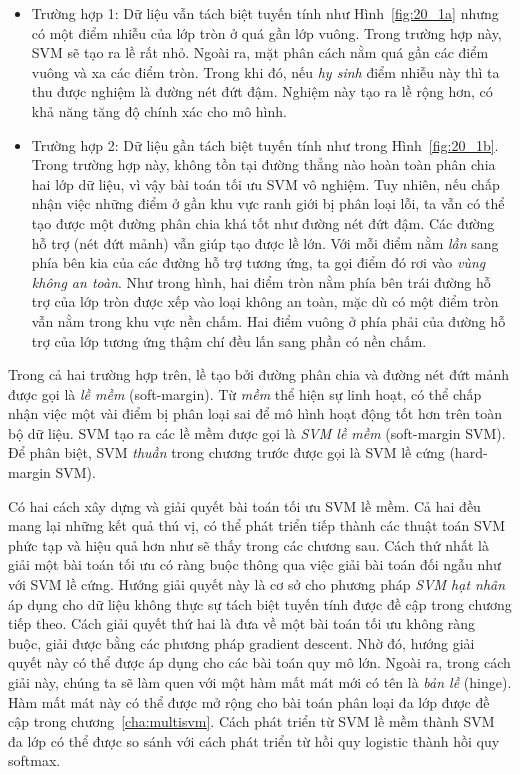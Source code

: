 \begin{itemize}
    \item Trường hợp 1: Dữ liệu vẫn tách biệt tuyến tính như Hình~\ref{fig:20_1a}
    nhưng có một điểm nhiễu của lớp tròn ở quá gần lớp vuông. Trong
    trường hợp này, SVM sẽ tạo ra lề rất nhỏ. Ngoài ra, mặt phân cách nằm quá gần các điểm
    vuông và xa các điểm tròn. Trong khi đó, nếu \textit{hy sinh} điểm
    nhiễu này thì ta thu được nghiệm là đường nét đứt đậm. Nghiệm này tạo ra lề rộng hơn, có khả năng tăng độ chính xác cho mô hình. 
     
    \item Trường hợp 2: Dữ liệu gần tách biệt tuyến tính như trong Hình~\ref{fig:20_1b}. Trong trường hợp
    này, không tồn tại đường thẳng nào hoàn toàn phân chia hai lớp dữ liệu, vì
    vậy bài toán tối ưu SVM vô nghiệm. Tuy nhiên, nếu chấp nhận việc những điểm ở gần khu vực ranh giới bị phân loại lỗi, ta vẫn có
    thể tạo được một đường phân chia khá tốt như đường nét đứt đậm. Các
    đường hỗ trợ (nét đứt mảnh) vẫn giúp tạo được lề lớn. Với mỗi điểm nằm \textit{lần} sang
    phía bên kia của các đường hỗ trợ tương ứng, ta gọi điểm đó rơi vào
    \textit{vùng không an toàn}. Như trong hình, hai điểm tròn nằm phía bên
    trái đường hỗ trợ của lớp tròn được xếp vào loại không an toàn, mặc
    dù có một điểm tròn vẫn nằm trong khu vực nền chấm. Hai điểm vuông ở
    phía phải của đường hỗ trợ của lớp tương ứng thậm chí đều lấn sang phần
    có nền chấm. 
\end{itemize}
Trong cả hai trường hợp trên, lề tạo bởi đường phân chia và đường
nét đứt mảnh được gọi là \textit{lề mềm} ({soft-margin}). Từ \textit{mềm} thể hiện sự linh hoạt, có thể chấp nhận việc một vài điểm bị phân loại sai để mô hình hoạt động tốt hơn trên toàn bộ dữ liệu. SVM tạo ra các lề mềm được gọi là \textit{SVM lề mềm} (soft-margin SVM). Để phân
biệt, SVM \textit{thuần} trong chương trước được gọi là SVM lề cứng (hard-margin SVM).
 
Có hai cách xây dựng và giải quyết bài toán tối ưu SVM lề mềm. Cả hai đều mang lại những kết quả thú vị, có thể phát triển tiếp thành các
thuật toán SVM phức tạp và hiệu quả hơn như sẽ thấy trong các chương sau. Cách thứ nhất là giải một bài toán tối ưu có ràng buộc thông qua việc giải bài
toán đối ngẫu như với SVM lề cứng. Hướng giải quyết này là cơ sở cho phương pháp \textit{SVM hạt nhân} áp dụng cho dữ liệu không thực
sự tách biệt tuyến tính được đề cập trong chương tiếp theo. Cách
giải quyết thứ hai là đưa về một bài toán tối ưu không ràng buộc, giải được bằng các phương pháp gradient descent. Nhờ đó, hướng giải
quyết này có thể được áp dụng cho các bài toán quy mô lớn. Ngoài ra, trong cách
giải này, chúng ta sẽ làm quen với một hàm mất mát mới có tên là \textit{bản lề} (hinge). Hàm mất mát này có thể được mở rộng cho bài toán phân loại đa lớp được đề cập trong chương~\ref{cha:multisvm}. Cách phát triển
từ SVM lề mềm thành SVM đa lớp có thể được so sánh
với cách phát triển từ hồi quy logistic thành hồi quy softmax. 
 
